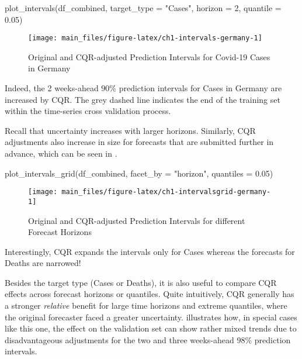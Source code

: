 \documentclass[
]{article}
\newenvironment{Shaded}{\begin{snugshade}}{\end{snugshade}}
\newcommand{\AttributeTok}[1]{\textcolor[rgb]{0.77,0.63,0.00}{#1}}
\newcommand{\DecValTok}[1]{\textcolor[rgb]{0.00,0.00,0.81}{#1}}
\newcommand{\FloatTok}[1]{\textcolor[rgb]{0.00,0.00,0.81}{#1}}
\newcommand{\FunctionTok}[1]{\textcolor[rgb]{0.00,0.00,0.00}{#1}}
\newcommand{\NormalTok}[1]{#1}
\newcommand{\StringTok}[1]{\textcolor[rgb]{0.31,0.60,0.02}{#1}}
\begin{document}
\begin{Shaded}
\begin{Highlighting}[]
\FunctionTok{plot\_intervals}\NormalTok{(df\_combined, }\AttributeTok{target\_type =} \StringTok{"Cases"}\NormalTok{, }\AttributeTok{horizon =} \DecValTok{2}\NormalTok{, }\AttributeTok{quantile =} \FloatTok{0.05}\NormalTok{)}
\end{Highlighting}
\end{Shaded}

\begin{figure}

{\centering \texttt{[image: main\_files/figure-latex/ch1-intervals-germany-1]} 

}

\caption{Original and CQR-adjusted Prediction Intervals for Covid-19 Cases in Germany}\label{fig:ch1-intervals-germany}
\end{figure}

Indeed, the 2 weeks-ahead \(90\)\% prediction intervals for Cases in Germany are increased by CQR.
The grey dashed line indicates the end of the training set within the time-series cross validation process.

Recall that uncertainty increases with larger horizons.
Similarly, CQR adjustments also increase in size for forecasts that are submitted further in advance, which can be seen in .

\begin{Shaded}
\begin{Highlighting}[]
\FunctionTok{plot\_intervals\_grid}\NormalTok{(df\_combined, }\AttributeTok{facet\_by =} \StringTok{"horizon"}\NormalTok{, }\AttributeTok{quantiles =} \FloatTok{0.05}\NormalTok{)}
\end{Highlighting}
\end{Shaded}

\begin{figure}

{\centering \texttt{[image: main\_files/figure-latex/ch1-intervalsgrid-germany-1]} 

}

\caption{Original and CQR-adjusted Prediction Intervals for different Forecast Horizons}\label{fig:ch1-intervalsgrid-germany}
\end{figure}

Interestingly, CQR expands the intervals only for Cases whereas the forecasts for Deaths are narrowed!

Besides the target type (Cases or Deaths), it is also useful to compare CQR effects across forecast horizons or quantiles.
Quite intuitively, CQR generally has a stronger \emph{relative} benefit for large time horizons and extreme quantiles, where the original forecaster faced a greater uncertainty.
 illustrates how, in special cases like this one, the effect on the validation set can show rather mixed trends due to disadvantageous adjustments for the two and three weeks-ahead \(98\)\% prediction intervals.
\end{document}
